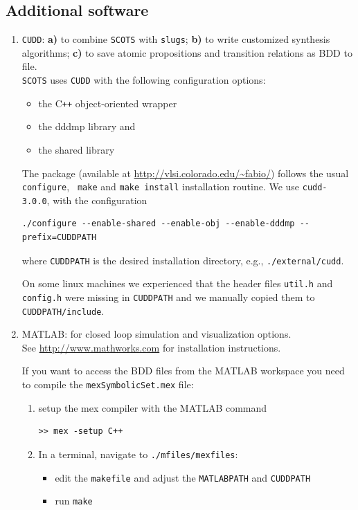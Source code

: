 \documentclass[a4paper]{amsart}
\newcommand\Cpp{C\texttt{++} }
\begin{document}
\subsection{Additional software} 
\label{s:installation:cudd}
\begin{enumerate}


  \item {\tt CUDD}: {\bf  a)} to combine {\tt SCOTS} with {\tt slugs}; {\bf  b)}
  to write customized synthesis algorithms; {\bf c)} to save atomic propositions
  and transition relations as BDD to file.\\
  {\tt SCOTS} uses {\tt CUDD} with the following configuration options:
     \begin{itemize}
      \item the \Cpp{} object-oriented wrapper
      \item the dddmp library and
      \item the shared library 
    \end{itemize}
   The package (available at \url{http://vlsi.colorado.edu/~fabio/})
 follows the usual {\tt \small configure}, {\tt
   \small make} and
   {\tt \small make install} installation routine. We use {\tt \small cudd-3.0.0}, with the
   configuration
  \begin{lstlisting}[basicstyle=\small\ttfamily,frame=none]
  ./configure --enable-shared --enable-obj --enable-dddmp --prefix=CUDDPATH
  \end{lstlisting}
  where {\tt CUDDPATH} is the desired installation directory, e.g., {\tt ./external/cudd}.

  On some linux machines we experienced that the header files {\tt \small util.h} and
  {\tt \small config.h} were missing in {\tt \small CUDDPATH} and we manually
  copied them to {\tt \small CUDDPATH/include}.


  \item MATLAB: for closed loop simulation and visualization options.\\
	See \url{http://www.mathworks.com} for installation instructions.

	If you want to access the BDD files from the MATLAB workspace you need to compile 
	the {\tt mexSymbolicSet.mex} file:
	\begin{enumerate}
 	\item setup the mex compiler with the MATLAB command
	\begin{lstlisting}[basicstyle=\small\ttfamily,frame=none]
	>> mex -setup C++
	\end{lstlisting}
	\item In a terminal, navigate to {\tt\small ./mfiles/mexfiles}:
	\begin{itemize}
		\item edit the {\tt makefile} and adjust the {\tt MATLABPATH} and {\tt CUDDPATH}
		\item run  {\tt make}
	 \end{itemize}
 \end{enumerate}



\end{enumerate}
\end{document}
